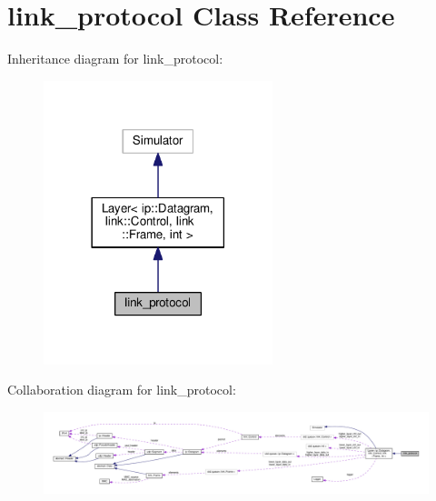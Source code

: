 \hypertarget{classlink__protocol}{}\section{link\+\_\+protocol Class Reference}
\label{classlink__protocol}


Inheritance diagram for link\+\_\+protocol\+:\nopagebreak
\begin{figure}[H]
\begin{center}
\leavevmode
\includegraphics[width=189pt]{classlink__protocol__inherit__graph}
\end{center}
\end{figure}


Collaboration diagram for link\+\_\+protocol\+:\nopagebreak
\begin{figure}[H]
\begin{center}
\leavevmode
\includegraphics[width=350pt]{classlink__protocol__coll__graph}
\end{center}
\end{figure}
